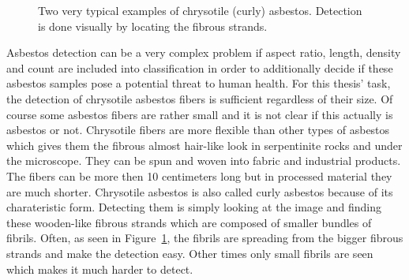 \begin{figure}[h]
\centering
\caption{Two very typical examples of chrysotile (curly) asbestos. Detection is done visually by locating the fibrous strands.}
\label{fig:chrysotile_classification}
\end{figure}

Asbestos detection can be a very complex problem if  aspect ratio, length, density and count are included into classification in order to additionally decide if these asbestos samples pose a potential threat to human health. For this thesis' task, the detection of chrysotile asbestos fibers is sufficient regardless of their size. Of course some asbestos fibers are rather small and it is not clear if this actually is asbestos or not. Chrysotile fibers are more flexible than other types of asbestos which gives them the fibrous almost hair-like look in serpentinite rocks and under the microscope. They can be spun and woven into fabric and industrial products. The fibers can be more then 10 centimeters  long but in processed material they are much shorter. Chrysotile asbestos is also called curly asbestos because of its charateristic form. Detecting  them is simply looking at the image and finding these wooden-like fibrous strands which are composed of smaller bundles of fibrils. Often, as  seen in Figure~\ref{fig:chrysotile_classification}, the fibrils are spreading  from the bigger fibrous strands and make the detection easy. Other times only small fibrils are seen which makes it much harder to detect.

